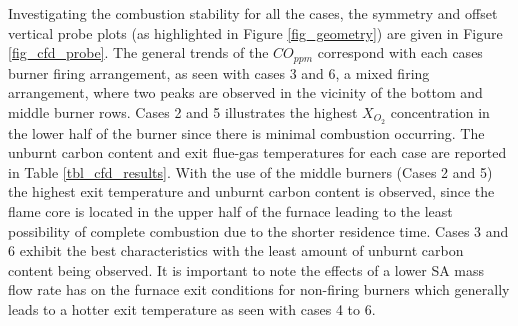 \documentclass[review]{elsarticle}
\begin{document}
Investigating the combustion stability for all the cases, the symmetry and offset vertical probe plots (as highlighted in Figure \ref{fig_geometry}) are given in Figure \ref{fig_cfd_probe}. The general trends of the $CO_{ppm}$ correspond with each cases burner firing arrangement, as seen with cases 3 and 6, a mixed firing arrangement, where two peaks are observed in the vicinity of the bottom and middle burner rows. Cases 2 and 5 illustrates the highest $X_{O_{2}}$ concentration in the lower half of the burner since there is minimal combustion occurring. The unburnt carbon content and exit flue-gas temperatures for each case are reported in Table \ref{tbl_cfd_results}. With the use of the middle burners (Cases 2 and 5) the highest exit temperature and unburnt carbon content is observed, since the flame core is located in the upper half of the furnace leading to the least possibility of complete combustion due to the shorter residence time. Cases 3 and 6 exhibit the best characteristics with the least amount of unburnt carbon content being observed. It is important to note the effects of a lower SA mass flow rate has on the furnace exit conditions for non-firing burners which generally leads to a hotter exit temperature as seen with cases 4 to 6. 
\end{document}

